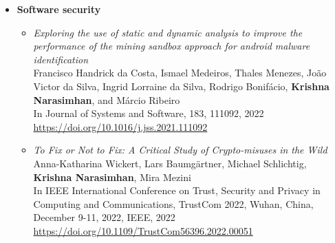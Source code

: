 \begin{itemize}
\begin{itemize}
\end{itemize}

\item \textbf{Software security}
\begin{itemize}

\item \emph{Exploring the use of static and dynamic analysis to improve the performance of the mining sandbox approach for android malware identification} \\
Francisco Handrick da Costa, Ismael Medeiros, Thales Menezes, João Victor da Silva, Ingrid Lorraine da Silva, Rodrigo Bonifácio, \textbf{Krishna Narasimhan}, and Márcio Ribeiro \\
In Journal of Systems and Software, 183, 111092, 2022 \\
\url{https://doi.org/10.1016/j.jss.2021.111092}

\item \emph{To Fix or Not to Fix: A Critical Study of Crypto-misuses in the Wild} \\
Anna-Katharina Wickert, Lars Baumgärtner, Michael Schlichtig, \textbf{Krishna Narasimhan}, Mira Mezini \\
In IEEE International Conference on Trust, Security and Privacy in Computing and Communications, TrustCom 2022, Wuhan, China, December 9-11, 2022, IEEE, 2022 \\
\url{https://doi.org/10.1109/TrustCom56396.2022.00051}
\end{itemize}

\end{itemize}